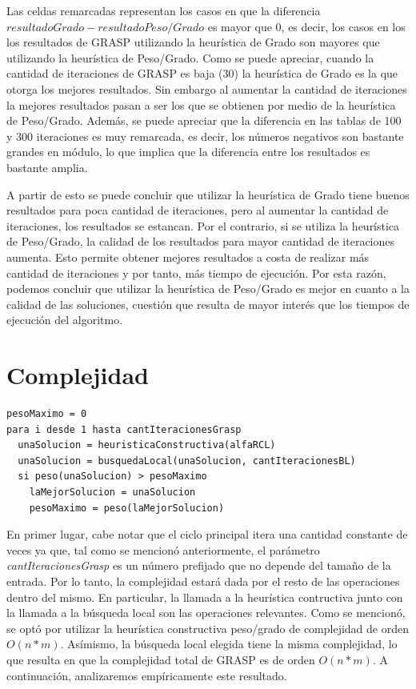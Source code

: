 \documentclass[a4paper,11pt] {article}
\begin{document}
Las celdas remarcadas representan los casos en que la diferencia $resultadoGrado - resultadoPeso/Grado$ es mayor que 0, es decir, los casos en los los resultados de GRASP utilizando la heur\'istica de Grado son mayores que utilizando la heur\'istica de Peso/Grado. Como se puede apreciar, cuando la cantidad de iteraciones de GRASP es baja (30) la heur\'istica de Grado es la que otorga los mejores resultados. Sin embargo al aumentar la cantidad de iteraciones la mejores resultados pasan a ser los que se obtienen por medio de la heur\'istica de Peso/Grado. Adem\'as, se puede apreciar que la diferencia en las tablas de 100 y 300 iteraciones es muy remarcada, es decir, los n\'umeros negativos son bastante grandes en m\'odulo, lo que implica que la diferencia entre los resultados es bastante amplia. 

A partir de esto se puede concluir que utilizar la heur\'istica de Grado tiene buenos resultados para poca cantidad de iteraciones, pero al aumentar la cantidad de iteraciones, los resultados se estancan. Por el contrario, si se utiliza la heur\'istica de Peso/Grado, la calidad de los resultados para mayor cantidad de iteraciones aumenta. Esto permite obtener mejores resultados a costa de realizar m\'as cantidad de iteraciones y por tanto, m\'as tiempo de ejecuci\'on. Por esta raz\'on, podemos concluir que utilizar la heur\'istica de Peso/Grado es mejor en cuanto a la calidad de las soluciones, cuesti\'on que resulta de mayor inter\'es que los tiempos de ejecuci\'on del algoritmo.

\section*{Complejidad}

\begin{verbatim}
pesoMaximo = 0
para i desde 1 hasta cantIteracionesGrasp
  unaSolucion = heuristicaConstructiva(alfaRCL)
  unaSolucion = busquedaLocal(unaSolucion, cantIteracionesBL)
  si peso(unaSolucion) > pesoMaximo
    laMejorSolucion = unaSolucion
    pesoMaximo = peso(laMejorSolucion)
\end{verbatim}

En primer lugar, cabe notar que el ciclo principal itera una cantidad constante de veces ya que, tal como se mencionó anteriormente, el parámetro \textit{cantIteracionesGrasp} es un número prefijado que no depende del tamaño de la entrada. Por lo tanto, la complejidad estará dada por el resto de las operaciones dentro del mismo. En particular, la llamada a la heurística contructiva junto con la llamada a la búsqueda local son las operaciones relevantes. Como se mencionó, se optó por utilizar la heurística constructiva peso/grado de complejidad de orden $O(n*m)$. Asímismo, la búsqueda local elegida tiene la misma complejidad, lo que resulta en que la complejidad total de GRASP es de orden $O(n*m)$. A continuación, analizaremos empíricamente este resultado.
\end{document}
